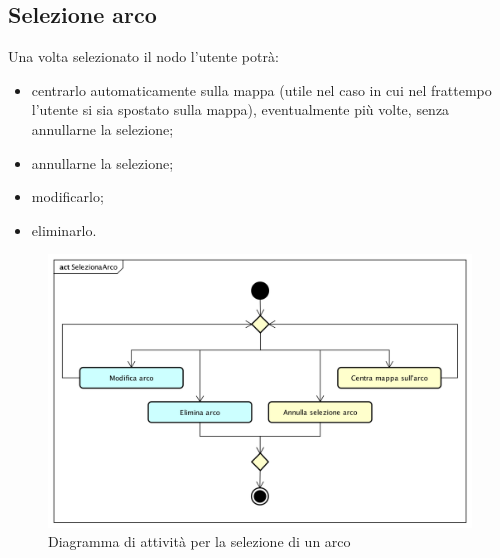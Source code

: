 \newpage
\subsection{Selezione arco}
Una volta selezionato il nodo l'utente potrà:
\begin{itemize}
	\item centrarlo automaticamente sulla mappa (utile nel caso in cui nel frattempo l'utente si sia spostato sulla mappa), eventualmente più volte, senza annullarne la selezione;
	\item annullarne la selezione;
	\item modificarlo;
	\item eliminarlo.
\end{itemize}
\begin{figure}[H]
	\centering
	\includegraphics[width=\textwidth]{img/DiagrammiDiAttivita/SelezioneArco.png}
	\caption{Diagramma di attività per la selezione di un arco}
\end{figure}

\newpage
